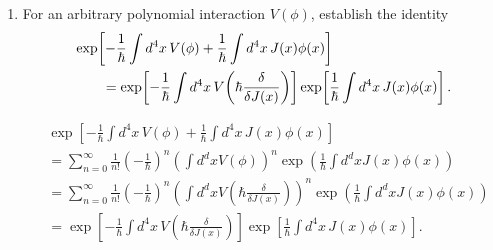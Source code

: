 \begin{enumerate}[label=\alph*)]
    \item For an arbitrary polynomial interaction $V(\phi)$, establish the identity
    \begin{align}
        &\exp\!\left[
            -\frac{1}{\hbar}\int d^4x\,V(\phi)
            +\frac{1}{\hbar}\int d^4x\,J(x)\phi(x)
        \right]
        \notag\\
        &\qquad=
        \exp\!\left[
            -\frac{1}{\hbar}\int d^4x\,
            V\!\left(\hbar\frac{\delta}{\delta J(x)}\right)
        \right]
        \exp\!\left[
            \frac{1}{\hbar}\int d^4x\,J(x)\phi(x)
        \right].
    \end{align}
    \begin{solution}
        \begin{equation}
            \begin{aligned}
                &\exp\!\left[
            -\frac{1}{\hbar}\int d^4x\,V(\phi)
            +\frac{1}{\hbar}\int d^4x\,J(x)\phi(x)
        \right]\\ &= \sum_{n=0}^\infty\frac{1}{n!}\left(-\frac{1}{\hbar}\right)^n\left(\int d^dxV(\phi)\right)^n\exp\left(\frac{1}{\hbar}\int d^dx J(x) \phi(x)\right)\\
        &=\sum_{n=0}^\infty\frac{1}{n!}\left(-\frac{1}{\hbar}\right)^n\left(\int d^dx V\left(\hbar \frac{\delta}{\delta J(x)}\right)\right)^n\exp\left(\frac{1}{\hbar}\int d^dx J(x) \phi(x)\right)\\
        &=\exp\!\left[
            -\frac{1}{\hbar}\int d^4x\,
            V\!\left(\hbar\frac{\delta}{\delta J(x)}\right)
        \right]
        \exp\!\left[
            \frac{1}{\hbar}\int d^4x\,J(x)\phi(x)
        \right].
            \end{aligned}
        \end{equation}
    \end{solution}


\end{enumerate}
